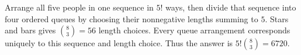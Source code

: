 Arrange all five people in one sequence in $5!$ ways, then divide that sequence into four ordered queues by choosing their nonnegative lengths summing to $5$. Stars and bars gives $\binom83=56$ length choices. Every queue arrangement corresponds uniquely to this sequence and length choice. Thus the answer is $5!\binom83=\boxed{6720}$.
